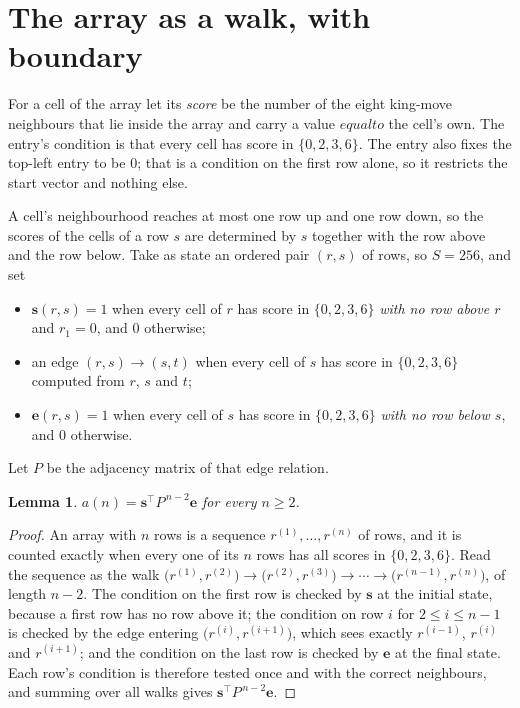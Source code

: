 \documentclass[11pt,a4paper]{article}
\theoremstyle{plain}
\newtheorem{lemma}[theorem]{Lemma}
\theoremstyle{definition}
\begin{document}
\section{The array as a walk, with boundary}

For a cell of the array let its \emph{score} be the number of the eight king-move neighbours that lie inside
the array and carry a value $equal to$ the cell's own. The entry's condition is that every cell
has score in $\{0,2,3,6\}$. The entry also fixes the top-left entry to be $0$; that is a condition on the first row alone, so it restricts the start vector and nothing else.

A cell's neighbourhood reaches at most one row up and one row down, so the scores of the
cells of a row $s$ are determined by $s$ together with the row above and the row below.
Take as state an ordered pair $(r,s)$ of rows, so $S=256$, and set
\begin{itemize}
\item $\mathbf{s}(r,s)=1$ when every cell of $r$ has score in $\{0,2,3,6\}$ \emph{with no row
above $r$} and $r_1=0$, and $0$ otherwise;
\item an edge $(r,s)\to(s,t)$ when every cell of $s$ has score in $\{0,2,3,6\}$ computed from
$r$, $s$ and $t$;
\item $\mathbf{e}(r,s)=1$ when every cell of $s$ has score in $\{0,2,3,6\}$ \emph{with no row
below $s$}, and $0$ otherwise.
\end{itemize}
Let $P$ be the adjacency matrix of that edge relation.

\begin{lemma}\label{lem:walk}
$a(n)=\mathbf{s}^{\!\top}P^{\,n-2}\mathbf{e}$ for every $n\ge2$.
\end{lemma}

\begin{proof}
An array with $n$ rows is a sequence $r^{(1)},\dots,r^{(n)}$ of rows, and it is counted
exactly when every one of its $n$ rows has all scores in $\{0,2,3,6\}$. Read the sequence as the
walk $\bigl(r^{(1)},r^{(2)}\bigr)\to\bigl(r^{(2)},r^{(3)}\bigr)\to\cdots\to
\bigl(r^{(n-1)},r^{(n)}\bigr)$, of length $n-2$. The condition on the first row is
checked by $\mathbf{s}$ at the initial state, because a first row has no row above it; the
condition on row $i$ for $2\le i\le n-1$ is checked by the edge entering
$\bigl(r^{(i)},r^{(i+1)}\bigr)$, which sees exactly $r^{(i-1)}$, $r^{(i)}$ and
$r^{(i+1)}$; and the condition on the last row is checked by $\mathbf{e}$ at the final
state. Each row's condition is therefore tested once and with the correct neighbours, and
summing over all walks gives $\mathbf{s}^{\!\top}P^{\,n-2}\mathbf{e}$.
\end{proof}
\end{document}
